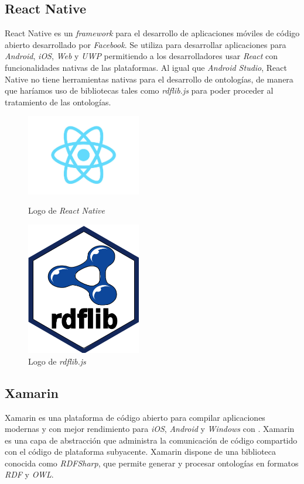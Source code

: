 \subsection{React Native}
React Native es un \textit{framework} para el desarrollo de aplicaciones móviles de código abierto desarrollado por 
\textit{Facebook}. Se utiliza para desarrollar aplicaciones para \textit{Android}, \textit{iOS}, \textit{Web} y 
\textit{UWP} permitiendo a los desarrolladores usar \textit{React} con funcionalidades nativas de las plataformas.
Al igual que \textit{Android Studio}, React Native no tiene herramientas nativas para el desarrollo de ontologías, de 
manera que haríamos uso de bibliotecas tales como \textit{rdflib.js} para poder proceder al tratamiento de las ontologías.

\begin{figure}[H]
    \centering
    \begin{minipage}{5cm}
        \centering
        \includegraphics[width=5cm]{Images/Logo_React.jpeg}
        \caption{Logo de \textit{React Native}}  
    \end{minipage}
    \hfill
    \begin{minipage}{5cm}
        \centering
        \includegraphics[width=5cm]{Images/Logo_Rdflib.jpeg}
        \caption{Logo de \textit{rdflib.js}}  
    \end{minipage}
\end{figure}

\subsection{Xamarin}
Xamarin es una plataforma de código abierto para compilar aplicaciones modernas y con mejor rendimiento para \textit{iOS}, 
\textit{Android} y \textit{Windows} con \textit{\dotnet}. Xamarin es una capa de abstracción que administra la comunicación 
de código compartido con el código de plataforma subyacente. Xamarin dispone de una biblioteca conocida como 
\textit{RDFSharp}, que permite generar y procesar ontologías en formatos \textit{RDF} y \textit{OWL}.

